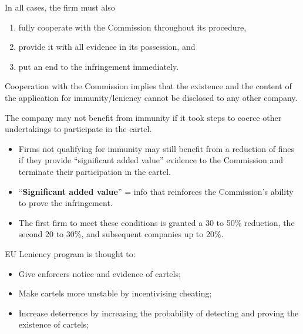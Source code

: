     In all cases, the firm must also
        \begin{enumerate}
            \item fully cooperate with the Commission throughout its procedure,
            \item provide it with all evidence in its possession, and
            \item put an end to the infringement immediately.
        \end{enumerate}
    
    Cooperation with the Commission implies that the existence and the content of the application for immunity/leniency cannot be disclosed to any other company.
    
    The company may not benefit from immunity if it took steps to coerce other undertakings to participate in the cartel.

    \begin{itemize}
        \item Firms not qualifying for immunity may still benefit from a reduction of fines if they provide ``significant added value'' evidence to the Commission and terminate their participation in the cartel.
        \item ``\textbf{Significant added value}'' = info that reinforces the Commission's ability to prove the infringement.
        \item The first firm to meet these conditions is granted a 30 to 50\% reduction, the second 20 to 30\%, and subsequent companies up to 20\%.
    \end{itemize}
    
    EU Leniency program is thought to:
    
    \begin{itemize}
        \item Give enforcers notice and evidence of cartels;
        \item Make cartels more unstable by incentivising cheating;
        \item Increase deterrence by increasing the probability of detecting and proving the existence of cartels;
    \end{itemize}


